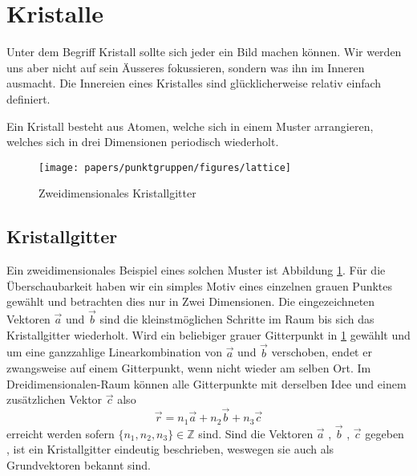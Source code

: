 \section{Kristalle}
Unter dem Begriff Kristall sollte sich jeder ein Bild machen können. 
Wir werden uns aber nicht auf sein Äusseres fokussieren, sondern was ihn im Inneren ausmacht.
Die Innereien eines Kristalles sind glücklicherweise relativ einfach definiert.
\begin{definition}[Kristall]
    Ein Kristall besteht aus Atomen, welche sich in einem Muster arrangieren, welches sich in drei Dimensionen periodisch wiederholt.
\end{definition}

\begin{figure}
    \centering
    \texttt{[image: papers/punktgruppen/figures/lattice]}
    \caption{
        Zweidimensionales Kristallgitter
        \label{fig:punktgruppen:lattice}
    }
\end{figure}
\subsection{Kristallgitter}
Ein zweidimensionales Beispiel eines solchen Muster ist Abbildung \ref{fig:punktgruppen:lattice}.
Für die Überschaubarkeit haben wir ein simples Motiv eines einzelnen grauen Punktes gewählt und betrachten dies nur in Zwei Dimensionen.
Die eingezeichneten Vektoren $\vec{a}$ und $\vec{b}$ sind die kleinstmöglichen Schritte im Raum bis sich das Kristallgitter wiederholt.
Wird ein beliebiger grauer Gitterpunkt in \ref{fig:punktgruppen:lattice} gewählt 
und um eine ganzzahlige Linearkombination von $\vec{a}$ und $\vec{b}$ verschoben, 
endet er zwangsweise auf einem Gitterpunkt, wenn nicht wieder am selben Ort.
Im Dreidimensionalen-Raum können alle Gitterpunkte mit derselben Idee und einem zusätzlichen Vektor $\vec{c}$ also 
\[
    \vec{r} = n_1 \vec{a} + n_2 \vec{b} + n_3 \vec{c}   
\]
erreicht werden sofern $\{n_1,n_2,n_3\} \in \mathbb{Z}$ sind.
Sind die Vektoren  $\vec{a}$ , $\vec{b}$ , $\vec{c}$ gegeben ,
ist ein Kristallgitter eindeutig beschrieben, weswegen sie auch als Grundvektoren bekannt sind.


